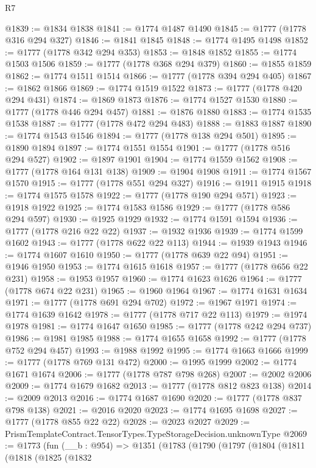 \begin{lexlean}{R7}
\begin{coremodule}
@1839 := @1834 @1838
@1841 := @1774 @1487 @1490
@1845 := @1777 (@1778 @316 @294 @327)
@1846 := @1841 @1845
@1848 := @1774 @1495 @1498
@1852 := @1777 (@1778 @342 @294 @353)
@1853 := @1848 @1852
@1855 := @1774 @1503 @1506
@1859 := @1777 (@1778 @368 @294 @379)
@1860 := @1855 @1859
@1862 := @1774 @1511 @1514
@1866 := @1777 (@1778 @394 @294 @405)
@1867 := @1862 @1866
@1869 := @1774 @1519 @1522
@1873 := @1777 (@1778 @420 @294 @431)
@1874 := @1869 @1873
@1876 := @1774 @1527 @1530
@1880 := @1777 (@1778 @446 @294 @457)
@1881 := @1876 @1880
@1883 := @1774 @1535 @1538
@1887 := @1777 (@1778 @472 @294 @483)
@1888 := @1883 @1887
@1890 := @1774 @1543 @1546
@1894 := @1777 (@1778 @138 @294 @501)
@1895 := @1890 @1894
@1897 := @1774 @1551 @1554
@1901 := @1777 (@1778 @516 @294 @527)
@1902 := @1897 @1901
@1904 := @1774 @1559 @1562
@1908 := @1777 (@1778 @164 @131 @138)
@1909 := @1904 @1908
@1911 := @1774 @1567 @1570
@1915 := @1777 (@1778 @551 @294 @327)
@1916 := @1911 @1915
@1918 := @1774 @1575 @1578
@1922 := @1777 (@1778 @190 @294 @571)
@1923 := @1918 @1922
@1925 := @1774 @1583 @1586
@1929 := @1777 (@1778 @586 @294 @597)
@1930 := @1925 @1929
@1932 := @1774 @1591 @1594
@1936 := @1777 (@1778 @216 @22 @22)
@1937 := @1932 @1936
@1939 := @1774 @1599 @1602
@1943 := @1777 (@1778 @622 @22 @113)
@1944 := @1939 @1943
@1946 := @1774 @1607 @1610
@1950 := @1777 (@1778 @639 @22 @94)
@1951 := @1946 @1950
@1953 := @1774 @1615 @1618
@1957 := @1777 (@1778 @656 @22 @231)
@1958 := @1953 @1957
@1960 := @1774 @1623 @1626
@1964 := @1777 (@1778 @674 @22 @231)
@1965 := @1960 @1964
@1967 := @1774 @1631 @1634
@1971 := @1777 (@1778 @691 @294 @702)
@1972 := @1967 @1971
@1974 := @1774 @1639 @1642
@1978 := @1777 (@1778 @717 @22 @113)
@1979 := @1974 @1978
@1981 := @1774 @1647 @1650
@1985 := @1777 (@1778 @242 @294 @737)
@1986 := @1981 @1985
@1988 := @1774 @1655 @1658
@1992 := @1777 (@1778 @752 @294 @457)
@1993 := @1988 @1992
@1995 := @1774 @1663 @1666
@1999 := @1777 (@1778 @769 @131 @472)
@2000 := @1995 @1999
@2002 := @1774 @1671 @1674
@2006 := @1777 (@1778 @787 @798 @268)
@2007 := @2002 @2006
@2009 := @1774 @1679 @1682
@2013 := @1777 (@1778 @812 @823 @138)
@2014 := @2009 @2013
@2016 := @1774 @1687 @1690
@2020 := @1777 (@1778 @837 @798 @138)
@2021 := @2016 @2020
@2023 := @1774 @1695 @1698
@2027 := @1777 (@1778 @855 @22 @22)
@2028 := @2023 @2027
@2029 := PrismTemplateContract.TensorTypes.TypeStorageDecision.unknownType
@2069 := @1773
    (fun (__b : @954) =>
    @1351
      (@1783
        (@1790
          (@1797
            (@1804
              (@1811
                (@1818
                  (@1825
                    (@1832

\end{coremodule}
\end{lexlean}
